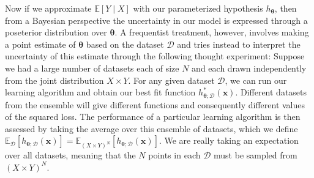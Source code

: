 \documentclass{article}
\theoremstyle{definition}
\theoremstyle{remark}
\theoremstyle{definition}
\begin{document}
Now if we approximate $\mathbb{E}[Y \mid X]$ with our parameterized hypothesis $h_{\boldsymbol{\theta}}$, then from a Bayesian perspective the uncertainty in our model is expressed through a poseterior distribution over ${\boldsymbol{\theta}}$. A frequentist treatment, however, involves making a point estimate of ${\boldsymbol{\theta}}$ based on the dataset $\mathcal{D}$ and tries instead to interpret the uncertainty of this estimate through the following thought experiment: Suppose we had a large number of datasets each of size $N$ and each drawn independently from the joint distribution $X \times Y$. For any given dataset $\mathcal{D}$, we can run our learning algorithm and obtain our best fit function $h_{{\boldsymbol{\theta}}; \mathcal{D}}^\ast (\mathbf{x})$. Different datasets from the ensemble will give different functions and consequently different values of the squared loss. The performance of a particular learning algorithm is then assessed by taking the average over this ensemble of datasets, which we define $\mathbb{E}_\mathcal{D} [h_{{\boldsymbol{\theta}}; \mathcal{D}} (\mathbf{x})] = \mathbb{E}_{(X \times Y)^N} [h_{{\boldsymbol{\theta}}; \mathcal{D}} (\mathbf{x})]$. We are really taking an expectation over all datasets, meaning that the $N$ points in each $\mathcal{D}$ must be sampled from $(X \times Y)^N$. 
\end{document}
